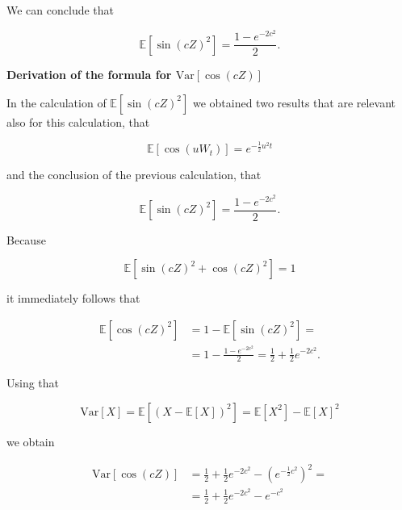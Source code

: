 \documentclass{letter}
\begin{document}
We can conclude that

$$\mathbb{E}\left[\sin(cZ)^2\right]=\frac{1-e^{-2c^2}}{2}.$$


{\bf Derivation of the formula for \boldmath$\text{Var}\left[\cos(cZ)\right]$}

In the calculation of $\mathbb{E}[\sin(cZ)^2]$ we obtained two results that are relevant also for this calculation, that

$$\mathbb{E}[\cos(uW_t)]=e^{-\frac{1}{2}u^2t}$$

and the conclusion of the previous calculation, that

$$\mathbb{E}[\sin(cZ)^2]=\frac{1-e^{-2c^2}}{2}.$$

Because

$$\mathbb{E}\left[\sin(cZ)^2+\cos(cZ)^2\right]=1$$

it immediately follows that

\begin{equation*}
\begin{split}
\mathbb{E}\left[\cos(cZ)^2\right]&=1-\mathbb{E}\left[\sin(cZ)^2\right]=\\
&=1-\frac{1-e^{-2c^2}}{2}=\frac{1}{2}+\frac{1}{2}e^{-2c^2}.
\end{split}
\end{equation*}

Using that

$$\text{Var}\left[X\right]=\mathbb{E}\left[\left(X-\mathbb{E}\left[X\right]\right)^2\right]=\mathbb{E}[X^2]-\mathbb{E}[X]^2$$

we obtain

\begin{equation*}
\begin{split}
\text{Var}\left[\cos\left(cZ\right)\right]&=\frac{1}{2}+\frac{1}{2}e^{-2c^2}-\left(e^{-\frac{1}{2}c^2}\right)^2=\\
&=\frac{1}{2}+\frac{1}{2}e^{-2c^2}-e^{-c^2}
\end{split}
\end{equation*}
\end{document}
